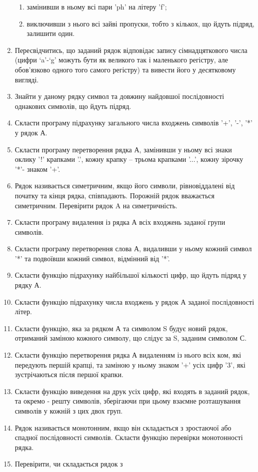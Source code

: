 \documentclass[]{article}
\makeatletter
\newcommand{\xslalph}[1]{\expandafter\@xslalph\csname c@#1\endcsname}
\newcommand{\@xslalph}[1]{%
    \ifcase#1\or а\or б\or в\or г\or д\or e\or є\or ж\or з\or i%
    \or й\or к\or л\or м\or н\or о\or п\or р\or с\or т%
    \or у\or ф\or х\or ц\or ч\or ш\or ю\or я\or аа\or бб\or вв %
    \else\@ctrerr\fi%
}
\makeatother
\begin{document}
\begin{enumerate}
\begin{enumerate}[label=\xslalph*)]
\item замінивши в ньому всі пари 'ph' на літеру 'f';
\item виключивши з нього всі зайві пропуски, тобто з кількох, що йдуть
підряд, залишити один.
\end{enumerate}
\item
Пересвідчитись, що заданий рядок відповідає запису сімнадцяткового числа
(цифри `a'-`g' можуть бути як великого так і маленького регістру, але
обов'язково одного того самого регістру) та вивести його у десятковому
вигляді.
\item
Знайти у даному рядку символ та довжину найдовшої послідовності
однакових символів, що йдуть підряд.
\item
Скласти програму підрахунку загального числа входжень символів '+', '-',
'*' у рядок А.
\item
Скласти програму перетворення рядка А, замінивши у ньому всі знаки
оклику '!' крапками '.', кожну крапку -- трьома крапками '...', кожну
зірочку '*'- знаком '+'.
\item
Рядок називається симетричним, якщо його символи, рівновіддалені від
початку та кінця рядка, співпадають. Порожній рядок вважається
симетричним. Перевірити рядок A на симетричність.
\item
Скласти програму видалення із рядка А всіх входжень заданої групи
символів.
\item
Скласти програму перетворення слова А, видаливши у ньому кожний символ
'*' та подвоївши кожний символ, відмінний від '*'.
\item
Скласти функцію підрахунку найбільшої кількості цифр, що йдуть підряд у
рядку А.
\item
Скласти функцію підрахунку числа входжень у рядок А заданої
послідовності літер.
\item
Скласти функцію, яка за рядком А та символом S будує новий рядок,
отриманий заміною кожного символу, що слідує за S, заданим символом С.
\item
Скласти функцію перетворення рядка А видаленням із нього всіх ком, які
передують першій крапці, та заміною у ньому знаком '+' усіх цифр '3',
які зустрічаються після першої крапки.
\item
Скласти функцію виведення на друк усіх цифр, які входять в заданий
рядок, та окремо - решту символів, зберігаючи при цьому взаємне
розташування символів у кожній з цих двох груп.
\item
Рядок називається монотонним, якщо він складається з зростаючої або
спадної послідовності символів. Скласти функцію перевірки монотонності
рядка.
\item
Перевірити, чи складається рядок з


\end{enumerate}
\end{document}
